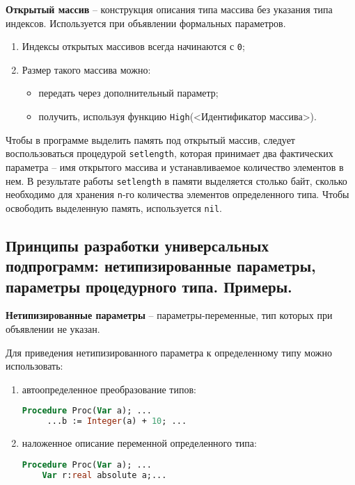 {\bf Открытый массив} – конструкция описания типа массива без указания типа индексов. Используется при объявлении формальных параметров.

\begin{enumerate}
    \item Индексы открытых массивов всегда начинаются с \texttt{0};

    \item Размер такого массива можно:
        \begin{itemize}
        \item передать через дополнительный параметр;
        \item получить, используя функцию \texttt{High}(<Идентификатор массива>).
        \end{itemize}
\end{enumerate}

Чтобы в программе выделить память под открытый массив, следует воспользоваться процедурой \texttt{setlength}, которая принимает два фактических параметра – имя открытого массива и устанавливаемое количество элементов в нем. В результате работы \texttt{setlength} в памяти выделяется столько байт, сколько необходимо для хранения \texttt{n}-го количества элементов определенного типа. Чтобы освободить выделенную память, используется \texttt{nil}.







\newpage\subsection{Принципы разработки универсальных подпрограмм:  нетипизированные параметры, параметры процедурного типа. Примеры. }


\begin{myquote}
            
\end{myquote}

{\bf Нетипизированные параметры} – параметры-переменные, тип которых при объявлении не указан.

\noindent
Для приведения нетипизированного параметра к определенному типу можно использовать:

\begin{enumerate}
\item автоопределенное преобразование типов:
\begin{lstlisting}[language = pascal]
 	Procedure Proc(Var a); ...
  	 ...b := Integer(а) + 10; ...
\end{lstlisting}

\item наложенное описание переменной определенного типа:
\begin{lstlisting}[language = pascal]
 	Procedure Proc(Var a); ...
    Var r:real absolute a;...
\end{lstlisting}
\end{enumerate}

